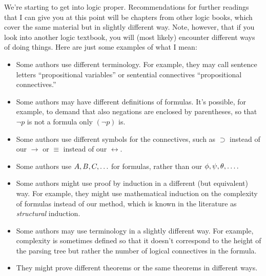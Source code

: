 We're starting to get into logic proper. Recommendations for further readings that I can give you at this point will be chapters from other logic books, which cover the same material but in slightly different way. Note, however, that if you look into another logic textbook, you will (most likely) encounter different ways of doing things. Here are just some examples of what I mean:
	\begin{itemize}
	
		\item Some authors use different terminology. For example, they may call sentence letters ``propositional variables'' or sentential connectives ``propositional connectives.''
		
		\item Some authors may have different definitions of formulas. It's possible, for example, to demand that also negations are enclosed by parentheses, so that $\neg p$ is not a formula only $(\neg p)$ is.
	
		\item Some authors use different symbols for the connectives, such as $\supset$ instead of our $\to$ or $\equiv$ instead of our $\leftrightarrow$. 
		
		\item Some authors use $A,B,C,\mathellipsis$ for formulas, rather than our $\phi,\psi,\theta,\mathellipsis.$
		
		\item Some authors might use proof by induction in a different (but equivalent) way. For example, they might use mathematical induction on the complexity of formulas instead of our method, which is known in the literature as \emph{structural} induction.
		
		\item Some authors may use terminology in a slightly different way. For example, complexity is sometimes defined so that it doesn't correspond to the height of the parsing tree but rather the number of logical connectives in the formula. 
		
		\item They might prove different theorems or the same theorems in different ways.
	
	\end{itemize}
	

